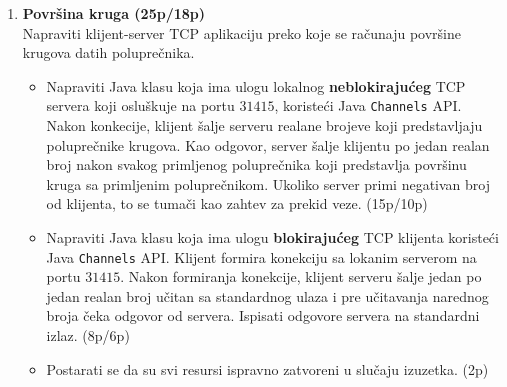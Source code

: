 \documentclass[]{article}
\begin{document}
\begin{enumerate}
\item \textbf{Povr\v{s}ina kruga (25p/18p)}
\\Napraviti klijent-server TCP aplikaciju preko koje se ra\v{c}unaju povr\v{s}ine krugova datih polupre\v{c}nika.
\begin{itemize}
  \item Napraviti Java klasu koja ima ulogu lokalnog \textbf{neblokiraju\'c{}eg} TCP servera koji oslu\v{s}kuje na portu $31415$, koriste\'c{}i Java \texttt{Channels} API. Nakon konkecije, klijent \v{s}alje serveru realane brojeve koji predstavljaju polupre\v{c}nike krugova. Kao odgovor, server \v{s}alje klijentu po jedan realan broj nakon svakog primljenog polupre\v{c}nika koji predstavlja povr\v{s}inu kruga sa primljenim polupre\v{c}nikom. Ukoliko server primi negativan broj od klijenta, to se tuma\v{c}i kao zahtev za prekid veze. \hfill (15p/10p)
  \item Napraviti Java klasu koja ima ulogu \textbf{blokiraju\'c{}eg} TCP klijenta koriste\'c{}i Java \texttt{Channels} API. Klijent formira konekciju sa lokanim serverom na portu $31415$. Nakon formiranja konekcije, klijent serveru \v{s}alje jedan po jedan realan broj u\v{c}itan sa standardnog ulaza i pre u\v{c}itavanja narednog broja \v{c}eka odgovor od servera. Ispisati odgovore servera na standardni izlaz. \hfill (8p/6p)
  \item Postarati se da su svi resursi ispravno zatvoreni u slu\v{c}aju izuzetka. \hfill (2p)
\end{itemize}

\end{enumerate}
\end{document}

